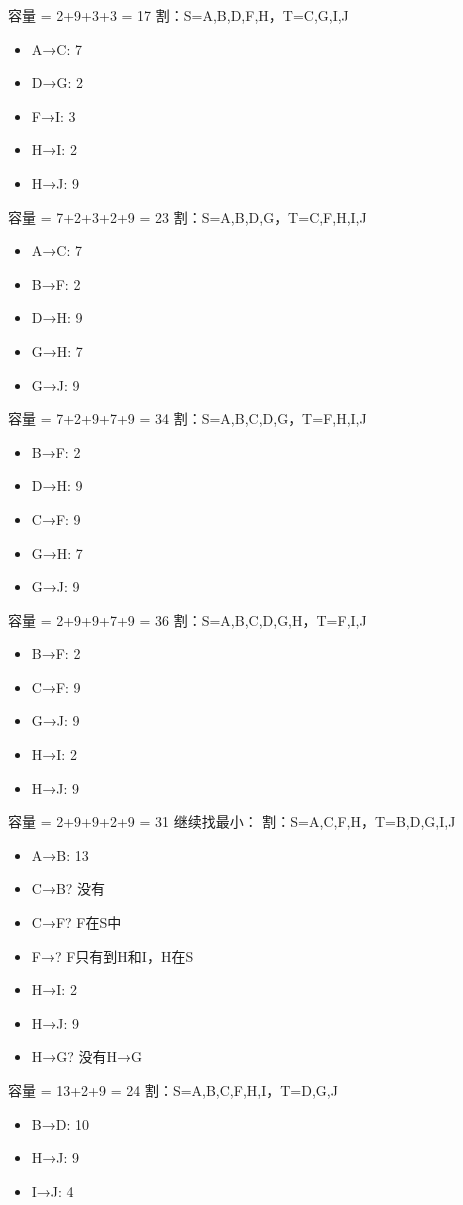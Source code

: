 \documentclass[10pt,a4paper,openany]{ctexbook}
\theoremstyle{definition}
\theoremstyle{remark}
\begin{document}
容量 = 2+9+3+3 = 17
割：S={A,B,D,F,H}，T={C,G,I,J}
\begin{itemize}
\item A→C: 7
\item D→G: 2
\item F→I: 3
\item H→I: 2
\item H→J: 9
\end{itemize}

容量 = 7+2+3+2+9 = 23
割：S={A,B,D,G}，T={C,F,H,I,J}
\begin{itemize}
\item A→C: 7
\item B→F: 2
\item D→H: 9
\item G→H: 7
\item G→J: 9
\end{itemize}

容量 = 7+2+9+7+9 = 34
割：S={A,B,C,D,G}，T={F,H,I,J}
\begin{itemize}
\item B→F: 2
\item D→H: 9
\item C→F: 9
\item G→H: 7
\item G→J: 9
\end{itemize}

容量 = 2+9+9+7+9 = 36
割：S={A,B,C,D,G,H}，T={F,I,J}
\begin{itemize}
\item B→F: 2
\item C→F: 9
\item G→J: 9
\item H→I: 2
\item H→J: 9
\end{itemize}

容量 = 2+9+9+2+9 = 31
继续找最小：
割：S={A,C,F,H}，T={B,D,G,I,J}
\begin{itemize}
\item A→B: 13
\item C→B? 没有
\item C→F? F在S中
\item F→? F只有到H和I，H在S
\item H→I: 2
\item H→J: 9
\item H→G? 没有H→G
\end{itemize}

容量 = 13+2+9 = 24
割：S={A,B,C,F,H,I}，T={D,G,J}
\begin{itemize}
\item B→D: 10
\item H→J: 9
\item I→J: 4
\end{itemize}
\end{document}
